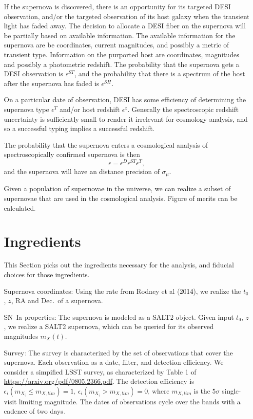 \documentclass[onecolumn]{aastex61}   	%
\begin{document}
If the supernova is discovered, there is an opportunity for its targeted DESI observation, and/or the targeted
observation of its host galaxy when the transient light has faded away.  
The decision to allocate a DESI fiber on the supernova will be partially based on available information. The available
information for the supernova are be coordinates, current magnitudes, and possibly a metric of transient type.
Information on the purported host are coordinates, magnitudes and possibly a photometric redshift.  
The probability that the supernova gets a DESI observation is $\epsilon^{ST}$, and the probability that there is a  spectrum of the host
after the supernova has faded is $\epsilon^{SH}$.

On a particular date of observation,
DESI has some efficiency of determining the supernova type  $\epsilon^T$ and/or host redshift $\epsilon^z$. 
Generally the spectroscopic redshift uncertainty is sufficiently small to render it irrelevant
for cosmology analysis, and so a successful typing implies a successful redshift.

The probability that the supernova enters a cosmological analysis of spectroscopically confirmed supernova is then
\begin{equation}
\epsilon = \epsilon^D \epsilon^{ST} \epsilon^T,
\end{equation}
and the supernova will have an distance precision of $\sigma_\mu$.

Given a population of supernovae in the universe, we can realize a subset of supernovae that are used in the cosmological analysis.
Figure of merits can be calculated.

\section{Ingredients}
This Section picks out the ingredients necessary for the analysis, and fiducial choices for those ingredients.

Supernova coordinates:  Using the rate from Rodney et al (2014),  we realize the $t_0$, $z$, RA and Dec.\ of a supernova.

SN~Ia properties: The supernova is modeled as a SALT2 object.  Given input $t_0$, $z$, we realize a SALT2 supernova,
which can be queried for its observed magnitudes $m_X(t)$.

Survey: The survey is characterized by the set of observations that cover the supernova.  Each observation as a date, filter, and detection efficiency.
We consider a simpified LSST survey, as characterized by Table 1 of  \url{https://arxiv.org/pdf/0805.2366.pdf}.  The detection efficiency
is $\epsilon_i(m_{X_i} \le m_{X, lim}) = 1$,   $\epsilon_i(m_{X_i} > m_{X, lim})=0$, where $m_{X,lim}$ is the $5\sigma$ single-visit limiting
magnitude.  The dates of observations cycle over the bands with a cadence of two days.
\end{document}
